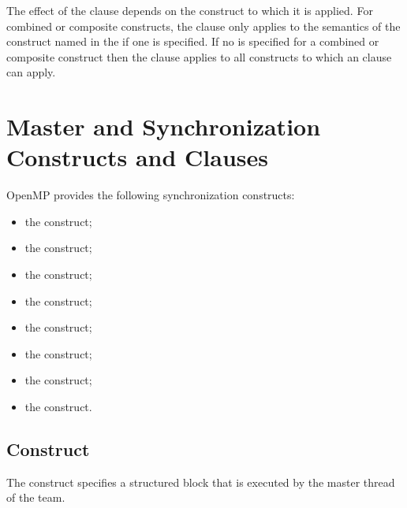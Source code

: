 {{{{\descr
The effect of the  clause depends on the construct to 
which it is applied. For combined or composite constructs, the
 clause only applies to the semantics of the construct 
named in the  if one is specified. 
If no   is specified for a combined 
or composite construct then the  clause applies to all 
constructs to which an  clause can apply.




\section{Master and Synchronization Constructs and Clauses}
\label{sec:Master and Synchronization Constructs and Clauses}
OpenMP provides the following synchronization constructs:
\begin{itemize}
\item the  construct;

\item the  construct;

\item the  construct;

\item the  construct;

\item the  construct;

\item the  construct;

\item the  construct;

\item the  construct.
\end{itemize}










\subsection{ Construct}
\label{subsec:master Construct}
\summary
The  construct specifies a structured block that is executed by the master thread 
of the team.

}}}}
